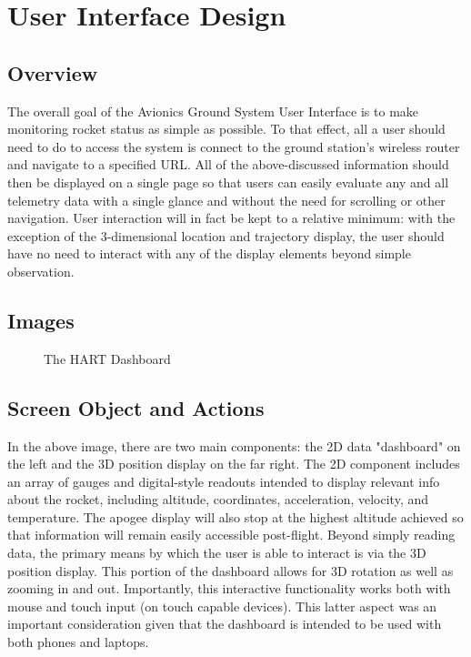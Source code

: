 \documentclass[journal,10pt,onecolumn,compsoc]{IEEEtran}
\begin{document}
\newpage


\section{User Interface Design}


	\subsection{Overview}
		The overall goal of the Avionics Ground System User Interface is to make monitoring rocket status as simple as possible.
		To that effect, all a user should need to do to access the system is connect to the ground station's wireless router and navigate to a specified URL.
		All of the above-discussed information should then be displayed on a single page so that users can easily evaluate any and all telemetry data with a single glance and without the need for scrolling or other navigation.
		User interaction will in fact be kept to a relative minimum: with the exception of the 3-dimensional location and trajectory display, the user should have no need to interact with any of the display elements beyond simple observation.
	
	\subsection{Images}
    \begin{figure}[H]
    \centering
    \caption{The HART Dashboard}
    \end{figure} 

	\subsection{Screen Object and Actions}
    In the above image, there are two main components: the 2D data "dashboard" on the left and the 3D position display on the far right.
    The 2D component includes an array of gauges and digital-style readouts intended to display relevant info about the rocket, including altitude, coordinates, acceleration, velocity, and temperature.
    The apogee display will also stop at the highest altitude achieved so that information will remain easily accessible post-flight.
		Beyond simply reading data, the primary means by which the user is able to interact is via the 3D position display.
    This portion of the dashboard allows for 3D rotation as well as zooming in and out.
    Importantly, this interactive functionality works both with mouse and touch input (on touch capable devices).
    This latter aspect was an important consideration given that the dashboard is intended to be used with both phones and laptops.
   
		
\end{document}
